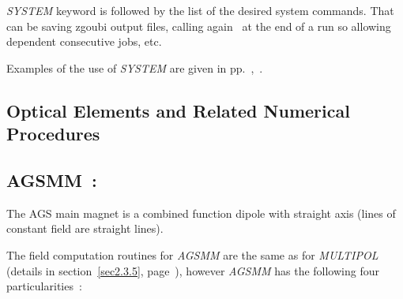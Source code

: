 \medskip 

\noindent  \textsl{SYSTEM} keyword is followed by the list of the desired system commands. That 
can be saving zgoubi output files, calling again \zgou\ at the end of a run so allowing 
dependent consecutive jobs, etc. 


\medskip 

 Examples of the use of \textsl{SYSTEM}  are given in pp.~\pageref{ExaFITREBELOTE},~\pageref{ExaSYSTEM}.  





\clearemptydoublepage


\subsection{Optical Elements and Related Numerical Procedures} \label{sec4.4}


\subsection*{AGSMM~:  \AGSMMTitl} \label{AGSMM}
\medskip 


The AGS main magnet is a combined function dipole with straight axis (lines of constant field are straight lines).  

\noindent The field computation routines for   \textsl{AGSMM}  are the same as for \textsl{MULTIPOL} 
(details in section~\ref{sec2.3.5}, page~\pageref{sec2.3.5}), 
however  \textsl{AGSMM}  has  the following four particularities~: 

